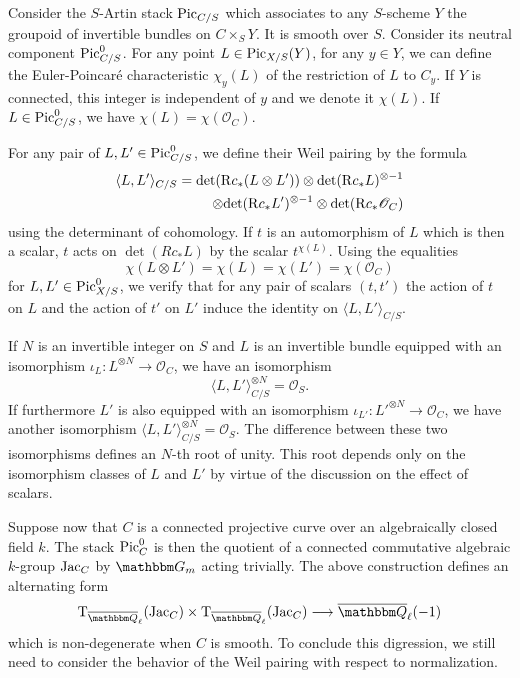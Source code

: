 \documentclass[12pt,english]{smfart}
\numberwithin{equation}{subsection}
\theoremstyle{remark}
\newcommand\calO{{\mathscr O}}
\newcommand\rmT{{\rm T}}
\newcommand\GG{{\mathbbm G}}
\newcommand\QQ{{\mathbbm Q}}
\newcommand\rmR{{\rm R}}
\newcommand\Pic{{\rm Pic}}
\newcommand\Ql{{\overline\QQ_\ell}}
\begin{document}
Consider the $S$-Artin stack $\Pic_{C/S}$ which associates to any $S$-scheme $Y$ the groupoid of invertible bundles on $C\times_S Y$. It is smooth over $S$. Consider its neutral component $\Pic^0_{C/S}$. For any point $L\in \Pic_{X/S}(Y)$, for any $y\in Y$, we can define the Euler-Poincar\'e characteristic $\chi_y(L)$ of the restriction of $L$ to $C_y$. If $Y$ is connected, this integer is independent of $y$ and we denote it $\chi(L)$. If $L\in \Pic^0_{C/S}$, we have $\chi(L)=\chi(\calO_C)$.

For any pair of $L,L'\in \Pic^0_{C/S}$, we define their Weil pairing by the formula
\begin{eqnarray*}
\langle L,L' \rangle_{C/S} = {\rm det}(\rmR c_*(L\otimes L'))\otimes {\rm det}(\rmR c_* L)^{\otimes-1} \\ \otimes {\rm det}(\rmR c_* L')^{\otimes-1} \otimes {\rm det}(\rmR c_* \calO_C)
\end{eqnarray*}
using the determinant of cohomology. If $t$ is an automorphism of $L$ which is then a scalar, $t$ acts on $\det(Rc_* L)$ by the scalar $t^{\chi(L)}$. Using the equalities
$$\chi(L\otimes L')=\chi(L)=\chi(L')=\chi(\calO_C)$$
for $L,L'\in \Pic^0_{X/S}$, we verify that for any pair of scalars $(t,t')$ the action of $t$ on $L$ and the action of $t'$ on $L'$ induce the identity on $\langle L,L' \rangle_{C/S}$.

If $N$ is an invertible integer on $S$ and $L$ is an invertible bundle equipped with an isomorphism $\iota_L:L^{\otimes N}\rightarrow\calO_C$, we have an isomorphism
$$\langle L,L' \rangle_{C/S}^{\otimes N}=\calO_S.$$
If furthermore $L'$ is also equipped with an isomorphism $\iota_{L'}:L'^{\otimes N}\rightarrow \calO_C$, we have another isomorphism $\langle L,L' \rangle_{C/S}^{\otimes N}=\calO_S$. The difference between these two isomorphisms defines an $N$-th root of unity. This root depends only on the isomorphism classes of $L$ and $L'$ by virtue of the discussion on the effect of scalars.


Suppose now that $C$ is a connected projective curve over an algebraically closed field $k$. The stack ${\rm Pic}_C^0$ is then the quotient of a connected commutative algebraic $k$-group ${\rm Jac}_C$ by $\GG_m$ acting trivially. The above construction defines an alternating form
$$\rmT_\Ql({\rm Jac}_C)\times \rmT_\Ql({\rm Jac}_C) \longrightarrow \Ql(-1)$$
which is non-degenerate when $C$ is smooth. To conclude this digression, we still need to consider the behavior of the Weil pairing with respect to normalization.
\end{document}
